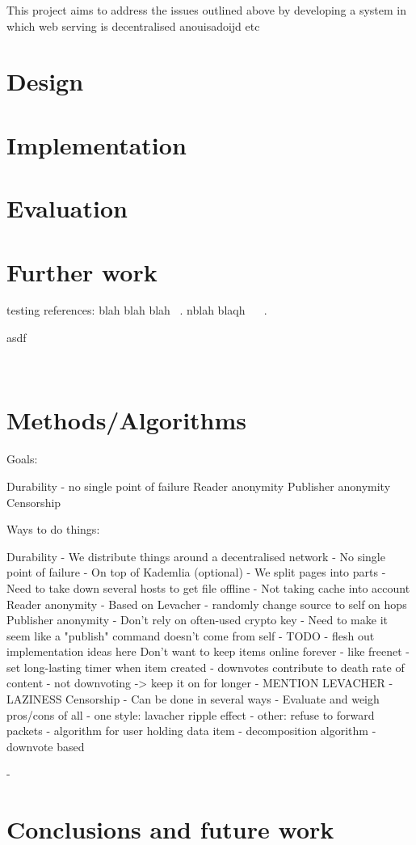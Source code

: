 \documentclass{article}
\begin{document}
This project aims to address the issues outlined above by developing a system in which web
serving is decentralised anouisadoijd etc

\section{Design}

\section{Implementation}

\section{Evaluation}

\section{Further work}


testing references: blah blah blah ~\cite{blanchfield}. nblah blaqh ~\cite{levacher} ~\cite{freenet}.

asdf

~\cite{torrent}

\section{Methods/Algorithms}

Goals:

Durability - no single point of failure
Reader anonymity
Publisher anonymity
Censorship


Ways to do things:

Durability
    - We distribute things around a decentralised network
    - No single point of failure
    - On top of Kademlia (optional)
        - We split pages into parts
        - Need to take down several hosts to get file offline
        - Not taking cache into account
Reader anonymity
    - Based on Levacher - randomly change source to self on hops
Publisher anonymity
    - Don't rely on often-used crypto key
    - Need to make it seem like a "publish" command doesn't come from self
    - TODO - flesh out implementation ideas here
Don't want to keep items online forever
    - like freenet
    - set long-lasting timer when item created
    - downvotes contribute to death rate of content
    - not downvoting -> keep it on for longer
    - MENTION LEVACHER - LAZINESS 
Censorship
    - Can be done in several ways
    - Evaluate and weigh pros/cons of all
    - one style: lavacher ripple effect
    - other: refuse to forward packets
    - algorithm for user holding data item
        - decomposition algorithm
        - downvote based

    - 

\section{Conclusions and future work}

\newpage{}

\end{document}
